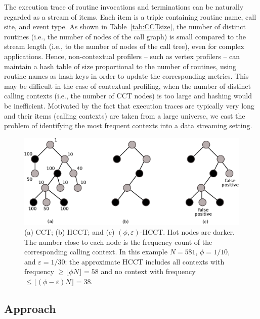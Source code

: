\documentclass{sigplanconf}
\begin{document}
The execution trace of routine invocations and terminations can be naturally regarded as a stream of items. Each item is a triple containing routine name, call site, and event type. As shown in Table~\ref{tab:CCTsize}, the number of distinct routines (i.e., the number of nodes of the call graph) is small compared to the stream length (i.e., to the number of nodes of the call tree), even for complex applications. Hence, non-contextual profilers -- such as vertex profilers -- can maintain a hash table of size proportional to the number of routines, using routine names as hash keys in order to update the corresponding metrics.  This may be difficult in the case of contextual profiling, when the number of distinct calling contexts (i.e., the number of CCT nodes) is too large and hashing would be inefficient. Motivated by the fact that execution traces are typically very long and their items (calling contexts) are taken from a large universe, we cast the problem of identifying the most frequent contexts into a data streaming setting.

\begin{figure}[t]
\includegraphics[width=\columnwidth]{hctt.eps}
\caption{(a) CCT; (b) HCCT; and (c) $(\phi,\varepsilon)$-HCCT. Hot nodes are darker. The number close to each node is the frequency count of the corresponding calling context. In this example $N=581$, $\phi=1/10$, and $\varepsilon=1/30$: the approximate HCCT includes all contexts with frequency $\ge\lfloor\phi N\rfloor=58$  and no context with frequency $\le\lfloor(\phi-\varepsilon) N\rfloor=38$.}
\label{fig:HCCT}
\end{figure} 


\subsection{Approach}
\label{ss:approach}
\end{document}
